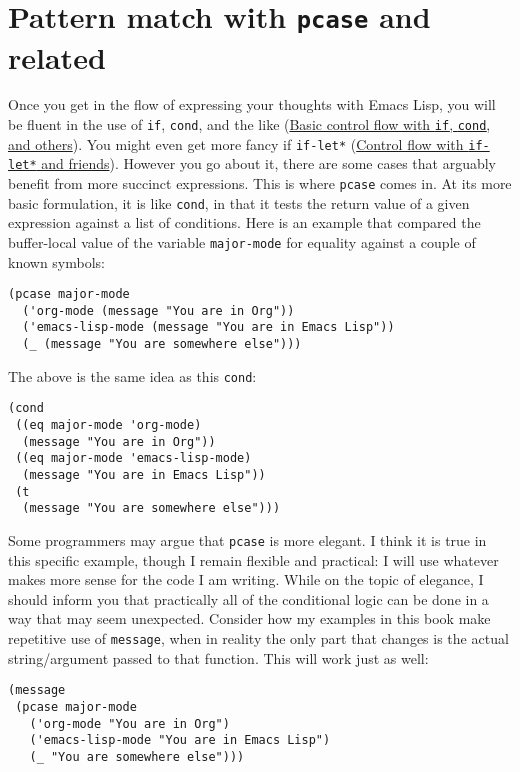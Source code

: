 \documentclass[11pt]{ctexart}
\begin{document}
\section{Pattern match with \texttt{pcase} and related}
\label{sec:orgc256332}
Once you get in the flow of expressing your thoughts with Emacs Lisp, you will be fluent in the use of \texttt{if}, \texttt{cond}, and the like (\hyperref[sec:org9074f8f]{Basic control flow with \texttt{if}, \texttt{cond}, and others}). You might even get more fancy if \texttt{if-let*} (\hyperref[sec:org8aa5d4d]{Control flow with \texttt{if-let*} and friends}). However you go about it, there are some cases that arguably benefit from more succinct expressions. This is where \texttt{pcase} comes in. At its more basic formulation, it is like \texttt{cond}, in that it tests the return value of a given expression against a list of conditions. Here is an example that compared the buffer-local value of the variable \texttt{major-mode} for equality against a couple of known symbols:

\begin{verbatim}
(pcase major-mode
  ('org-mode (message "You are in Org"))
  ('emacs-lisp-mode (message "You are in Emacs Lisp"))
  (_ (message "You are somewhere else")))
\end{verbatim}

The above is the same idea as this \texttt{cond}:

\begin{verbatim}
(cond
 ((eq major-mode 'org-mode)
  (message "You are in Org"))
 ((eq major-mode 'emacs-lisp-mode)
  (message "You are in Emacs Lisp"))
 (t
  (message "You are somewhere else")))
\end{verbatim}

Some programmers may argue that \texttt{pcase} is more elegant. I think it is true in this specific example, though I remain flexible and practical: I will use whatever makes more sense for the code I am writing. While on the topic of elegance, I should inform you that practically all of the conditional logic can be done in a way that may seem unexpected. Consider how my examples in this book make repetitive use of \texttt{message}, when in reality the only part that changes is the actual string/argument passed to that function. This will work just as well:

\begin{verbatim}
(message
 (pcase major-mode
   ('org-mode "You are in Org")
   ('emacs-lisp-mode "You are in Emacs Lisp")
   (_ "You are somewhere else")))
\end{verbatim}
\end{document}
